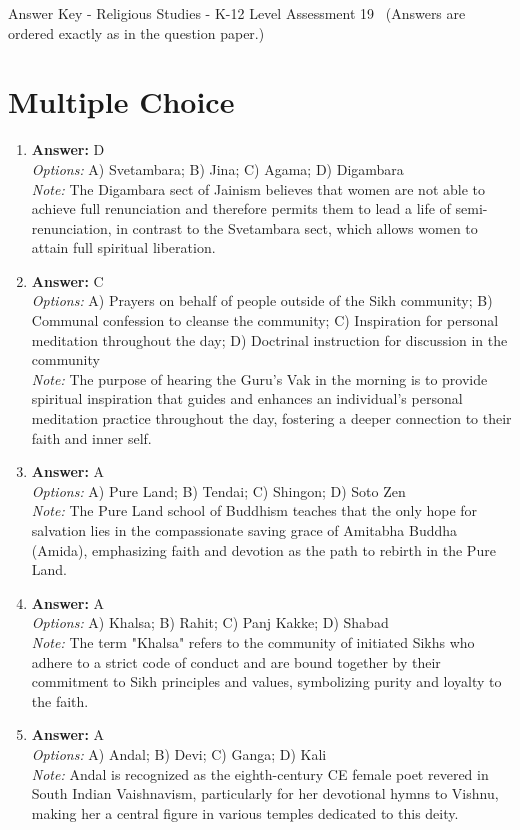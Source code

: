 \documentclass[12pt]{article}
\begin{document}
\begin{center}
Answer Key - Religious Studies - K-12 Level Assessment 19 \
\small (Answers are ordered exactly as in the question paper.)
\end{center}

\section*{Multiple Choice}
\begin{enumerate}[label=\arabic*.]
\item \textbf{Answer:} D
\\ \textit{Options:} A) Svetambara; B) Jina; C) Agama; D) Digambara
\\ \textit{Note:} The Digambara sect of Jainism believes that women are not able to achieve full renunciation and therefore permits them to lead a life of semi-renunciation, in contrast to the Svetambara sect, which allows women to attain full spiritual liberation.
\item \textbf{Answer:} C
\\ \textit{Options:} A) Prayers on behalf of people outside of the Sikh community; B) Communal confession to cleanse the community; C) Inspiration for personal meditation throughout the day; D) Doctrinal instruction for discussion in the community
\\ \textit{Note:} The purpose of hearing the Guru's Vak in the morning is to provide spiritual inspiration that guides and enhances an individual's personal meditation practice throughout the day, fostering a deeper connection to their faith and inner self.
\item \textbf{Answer:} A
\\ \textit{Options:} A) Pure Land; B) Tendai; C) Shingon; D) Soto Zen
\\ \textit{Note:} The Pure Land school of Buddhism teaches that the only hope for salvation lies in the compassionate saving grace of Amitabha Buddha (Amida), emphasizing faith and devotion as the path to rebirth in the Pure Land.
\item \textbf{Answer:} A
\\ \textit{Options:} A) Khalsa; B) Rahit; C) Panj Kakke; D) Shabad
\\ \textit{Note:} The term "Khalsa" refers to the community of initiated Sikhs who adhere to a strict code of conduct and are bound together by their commitment to Sikh principles and values, symbolizing purity and loyalty to the faith.
\item \textbf{Answer:} A
\\ \textit{Options:} A) Andal; B) Devi; C) Ganga; D) Kali
\\ \textit{Note:} Andal is recognized as the eighth-century CE female poet revered in South Indian Vaishnavism, particularly for her devotional hymns to Vishnu, making her a central figure in various temples dedicated to this deity.
\end{enumerate}
\end{document}
